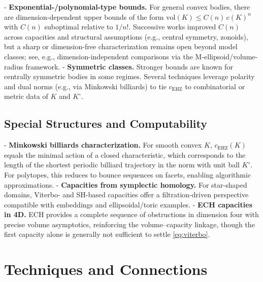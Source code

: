- \textbf{Exponential-/polynomial-type bounds.} For general convex bodies, there are dimension-dependent
  upper bounds of the form $\mathrm{vol}(K)\le C(n)\,c(K)^n$ with $C(n)$ suboptimal relative to $1/n!$.
  Successive works improved $C(n)$ across capacities and structural assumptions (e.g., central symmetry,
  zonoids), but a sharp or dimension-free characterization remains open beyond model classes; see, e.g.,
  dimension-independent comparisons via the M-ellipsoid/volume-radius framework\cite{ArtsteinAvidanMilmanOstrover2008}.
- \textbf{Symmetric classes.} Stronger bounds are known for centrally symmetric bodies in some regimes.
  Several techniques leverage polarity and dual norms (e.g., via Minkowski billiards) to tie
  $c_{\mathrm{EHZ}}$ to combinatorial or metric data of $K$ and $K^{\circ}$.

\subsection{Special Structures and Computability}

- \textbf{Minkowski billiards characterization.} For smooth convex $K$, $c_{\mathrm{EHZ}}(K)$ equals the
  minimal action of a closed characteristic, which corresponds to the length of the shortest periodic
  billiard trajectory in the norm with unit ball $K^{\circ}$. For polytopes, this reduces to bounce
  sequences on facets, enabling algorithmic approximations.
- \textbf{Capacities from symplectic homology.} For star-shaped domains, Viterbo- and SH-based capacities
  offer a filtration-driven perspective compatible with embeddings and ellipsoidal/toric examples\cite{Viterbo2000,Irie2022}.
- \textbf{ECH capacities in 4D.} ECH provides a complete sequence of obstructions in dimension four with
  precise volume asymptotics\cite{CristofaroGardiner2015}, reinforcing the volume--capacity linkage, though the first capacity alone
  is generally not sufficient to settle \eqref{eq:viterbo}.

\section{Techniques and Connections}

